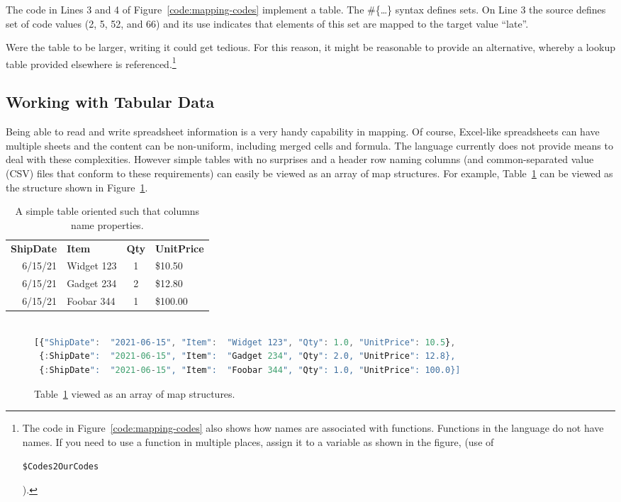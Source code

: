 \documentclass[9pt,letterpaper]{article}
\newcommand{\stt}[1]{\begin{footnotesize}\texttt{#1}\end{footnotesize}}
\begin{document}
The code in Lines 3 and 4 of Figure~\ref{code:mapping-codes} implement a table.
The \#\{\ldots\} syntax defines sets.
On Line 3 the source defines set of code values (2, 5, 52, and 66) and its use indicates that elements of this set are mapped to the target value ``late''.

Were the table to be larger, writing it could get tedious.
For this reason, it might be reasonable to provide an alternative, whereby a lookup table provided elsewhere is referenced.\footnote{The code in Figure~\ref{code:mapping-codes} also
  shows how names are associated with functions.
  Functions in the language do not have names.
  If you need to use a function in multiple places, assign it to a variable as shown in the figure, (use of \stt{\$Codes2OurCodes}).}

\subsection{Working with Tabular Data}

Being able to read  and write spreadsheet information is a very handy capability in mapping.
Of course, Excel-like spreadsheets can have multiple sheets and the content can be non-uniform, including merged cells and formula.
The language currently does not provide means to deal with these complexities.
However simple tables with no surprises and a header row naming columns (and common-separated value (CSV) files that conform to these requirements) can easily be viewed as an array of map structures.
For example, Table~\ref{table:simple} can be viewed as the structure shown in Figure~\ref{code:simple}.

\begin{table}[H]
  \caption{A simple table oriented such that columns name properties.}
\label{table:simple}
\begin{tabular}{r | l | c | l}

\textbf{ShipDate}& \textbf{Item}& \textbf{Qty}& \textbf{UnitPrice} \\ \hhline{=|=|=|=}
        6/15/21	      & Widget 123   &	1	   &  \$10.50 \\
        6/15/21	      & Gadget 234   &	2	   &  \$12.80 \\
        6/15/21	      & Foobar 344   &	1	   &  \$100.00
\end{tabular}
\end{table}

\begin{figure}[H]
    \caption{Table~\ref{table:simple} viewed as an array of map structures.}
    \label{code:simple}
\begin{lstlisting}[language=JavaScript]

[{"ShipDate":  "2021-06-15", "Item":  "Widget 123", "Qty": 1.0, "UnitPrice": 10.5},
 {:ShipDate":  "2021-06-15", "Item":  "Gadget 234", "Qty": 2.0, "UnitPrice": 12.8},
 {:ShipDate":  "2021-06-15", "Item":  "Foobar 344", "Qty": 1.0, "UnitPrice": 100.0}]
\end{lstlisting}
\end{figure}
\end{document}
